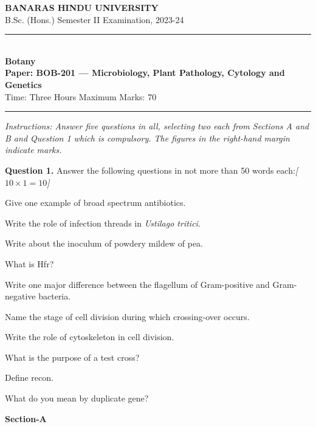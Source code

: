 \documentclass[11pt,a4paper]{article}
\newcommand{\pts}[1]{\hfill   \textit{[#1]}}
\begin{document}
\begin{center}
  {\large\bfseries BANARAS HINDU UNIVERSITY}\\[2pt]
  {\normalsize B.Sc. (Hons.) Semester II Examination, 2023-24}\\[6pt]
  \rule{0.8\linewidth}{0.5pt}\\[6pt]
  {\large\bfseries Botany}\\[4pt]
  {\large\bfseries Paper: BOB-201 --- Microbiology, Plant Pathology, Cytology and Genetics}\\[4pt]
  {\normalsize Time: Three Hours \hfill Maximum Marks: 70}
\end{center}

\rule{\linewidth}{0.4pt}

\smallskip



\noindent   \textit{Instructions: Answer five questions in all, selecting two each from Sections A and B and Question 1 which is compulsory. The figures in the right-hand margin indicate marks.}

\bigskip

\medskip


\noindent   \textbf{Question 1.} Answer the following questions in not more than 50 words each:\pts{$10  \times 1 = 10$}

\begin{parts}
  \item Give one example of broad spectrum antibiotics.
  \item Write the role of infection threads in   \textit{Ustilago tritici}.
  \item Write about the inoculum of powdery mildew of pea.
  \item What is Hfr?
  \item Write one major difference between the flagellum of Gram-positive and Gram-negative bacteria.
  \item Name the stage of cell division during which crossing-over occurs.
  \item Write the role of cytoskeleton in cell division.
  \item What is the purpose of a test cross?
  \item Define recon.
  \item What do you mean by duplicate gene?
\end{parts}

\bigskip

\begin{center}
   \textbf{Section-A}
\end{center}
\medskip
\end{document}
